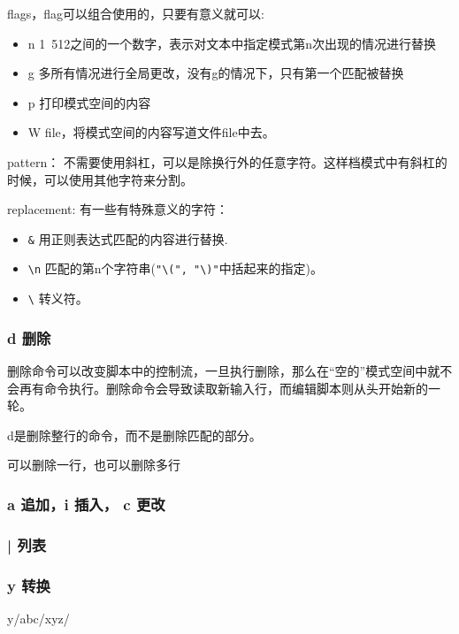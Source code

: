 flags，flag可以组合使用的，只要有意义就可以:
\begin{itemize}
\item n 1~512之间的一个数字，表示对文本中指定模式第n次出现的情况进行替换
\item g 多所有情况进行全局更改，没有g的情况下，只有第一个匹配被替换
\item p 打印模式空间的内容
\item W file，将模式空间的内容写道文件file中去。
\end{itemize}

pattern：
不需要使用斜杠，可以是除换行外的任意字符。这样档模式中有斜杠的时候，可以使用其他字符来分割。

replacement:
有一些有特殊意义的字符：
\begin{itemize}
\item \lstinline$&$ 用正则表达式匹配的内容进行替换.
\item \lstinline$\n$ 匹配的第n个字符串(\lstinline$"\(", "\)"$中括起来的指定)。
\item \lstinline$\$ 转义符。
\end{itemize}


\subsubsection{d 删除}

删除命令可以改变脚本中的控制流，一旦执行删除，那么在“空的”模式空间中就不会再有命令执行。删除命令会导致读取新输入行，而编辑脚本则从头开始新的一轮。

d是删除整行的命令，而不是删除匹配的部分。

可以删除一行，也可以删除多行

\subsubsection{a 追加，i 插入， c 更改}



\subsubsection{| 列表}

\subsubsection{y 转换}

\begin{Command-Line}
[address]y/abc/xyz/
\end{Command-Line}

